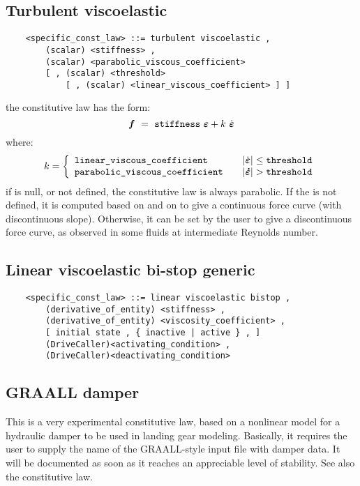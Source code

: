\subsection{Turbulent viscoelastic}
\begin{verbatim}
    <specific_const_law> ::= turbulent viscoelastic ,
        (scalar) <stiffness> ,
        (scalar) <parabolic_viscous_coefficient>
        [ , (scalar) <threshold> 
            [ , (scalar) <linear_viscous_coefficient> ] ]
\end{verbatim}
the constitutive law has the form:
\begin{displaymath}
    \T{f} \ = \ \kw{stiffness} \ \T{\varepsilon} + k \ \dot{\T{\varepsilon}}
\end{displaymath}
where:
\begin{displaymath}
    k = \lcubr{\matr{lcr}{
        \kw{linear\_viscous\_coefficient} & & 
            \shbr{\dot{\T{\varepsilon}}} \leq \kw{threshold} \\
        \kw{parabolic\_viscous\_coefficient} & &
            \shbr{\T{\dot{\varepsilon}}} > \kw{threshold}
    }}
\end{displaymath}
if  is null, or not defined, the constitutive law is always
parabolic. If the  is not defined, it is
computed based on  and on 
 to give a continuous force curve (with discontinuous slope).
Otherwise, it can be set by the user to give a discontinuous force curve,
as observed in some fluids at intermediate Reynolds number.

\subsection{Linear viscoelastic bi-stop generic}
\begin{verbatim}
    <specific_const_law> ::= linear viscoelastic bistop ,
        (derivative_of_entity) <stiffness> ,
        (derivative_of_entity) <viscosity_coefficient> ,
        [ initial state , { inactive | active } , ]
        (DriveCaller)<activating_condition> ,
        (DriveCaller)<deactivating_condition>
\end{verbatim}
  
\subsection{GRAALL damper}
This is a very experimental constitutive law, based on a nonlinear model
for a hydraulic damper to be used in landing gear modeling.
Basically, it requires the user to supply the name of the GRAALL-style 
input file with damper data.
It will be documented as soon as it reaches an appreciable level of
stability.
See also the 
constitutive law.


